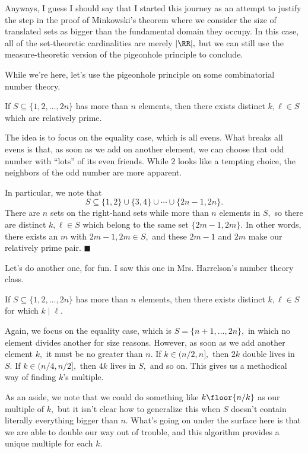 Anyways, I guess I should say that I started this journey as an attempt to justify the step in the proof of Minkowski's theorem where we consider the size of translated sets as bigger than the fundamental domain they occupy. In this case, all of the set-theoretic cardinalities are merely $|\RR|,$ but we can still use the measure-theoretic version of the pigeonhole principle to conclude.

While we're here, let's use the pigeonhole principle on some combinatorial number theory.
\begin{proposition}
    If $S\subseteq\{1,2,\ldots,2n\}$ has more than $n$ elements, then there exists distinct $k,\ell\in S$ which are relatively prime.
\end{proposition}
The idea is to focus on the equality case, which is all evens. What breaks all evens is that, as soon as we add on another element, we can choose that odd number with ``lots'' of its even friends. While $2$ looks like a tempting choice, the neighbors of the odd number are more apparent.

In particular, we note that
\[S\subseteq\{1,2\}\cup\{3,4\}\cup\cdots\cup\{2n-1,2n\}.\]
There are $n$ sets on the right-hand sets while more than $n$ elements in $S,$ so there are distinct $k,\ell\in S$ which belong to the same set $\{2m-1,2m\}.$ In other words, there exists an $m$ with $2m-1,2m\in S,$ and these $2m-1$ and $2m$ make our relatively prime pair. $\blacksquare$

Let's do another one, for fun. I saw this one in Mrs. Harrelson's number theory class.
\begin{proposition}
    If $S\subseteq\{1,2,\ldots,2n\}$ has more than $n$ elements, then there exists distinct $k,\ell\in S$ for which $k\mid\ell.$
\end{proposition}
Again, we focus on the equality case, which is $S=\{n+1,\ldots,2n\},$ in which no element divides another for size reasons. However, as soon as we add another element $k,$ it must be no greater than $n.$ If $k\in(n/2,n],$ then $2k$ double lives in $S.$ If $k\in(n/4,n/2],$ then $4k$ lives in $S,$ and so on. This gives us a methodical way of finding $k$'s multiple.

As an aside, we note that we could do something like $k\floor{n/k}$ as our multiple of $k,$ but it isn't clear how to generalize this when $S$ doesn't contain literally everything bigger than $n.$ What's going on under the surface here is that we are able to double our way out of trouble, and this algorithm provides a unique multiple for each $k.$

